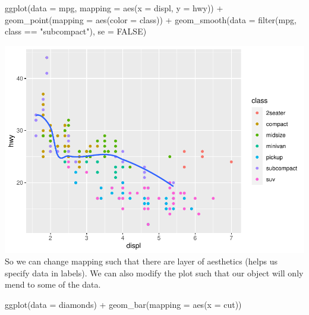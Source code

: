 \documentclass[
]{article}
\newenvironment{Shaded}{\begin{snugshade}}{\end{snugshade}}
\newcommand{\AttributeTok}[1]{\textcolor[rgb]{0.77,0.63,0.00}{#1}}
\newcommand{\ConstantTok}[1]{\textcolor[rgb]{0.00,0.00,0.00}{#1}}
\newcommand{\FunctionTok}[1]{\textcolor[rgb]{0.00,0.00,0.00}{#1}}
\newcommand{\NormalTok}[1]{#1}
\newcommand{\SpecialCharTok}[1]{\textcolor[rgb]{0.00,0.00,0.00}{#1}}
\newcommand{\StringTok}[1]{\textcolor[rgb]{0.31,0.60,0.02}{#1}}
\begin{document}
\begin{Shaded}
\begin{Highlighting}[]
\FunctionTok{ggplot}\NormalTok{(}\AttributeTok{data =}\NormalTok{ mpg, }\AttributeTok{mapping =} \FunctionTok{aes}\NormalTok{(}\AttributeTok{x =}\NormalTok{ displ, }\AttributeTok{y =}\NormalTok{ hwy)) }\SpecialCharTok{+} 
  \FunctionTok{geom\_point}\NormalTok{(}\AttributeTok{mapping =} \FunctionTok{aes}\NormalTok{(}\AttributeTok{color =}\NormalTok{ class)) }\SpecialCharTok{+} 
  \FunctionTok{geom\_smooth}\NormalTok{(}\AttributeTok{data =} \FunctionTok{filter}\NormalTok{(mpg, class }\SpecialCharTok{==} \StringTok{"subcompact"}\NormalTok{), }\AttributeTok{se =} \ConstantTok{FALSE}\NormalTok{)}
\end{Highlighting}
\end{Shaded}

\includegraphics{Journal_files/figure-latex/unnamed-chunk-49-4.pdf} So
we can change mapping such that there are layer of aesthetics (helps us
specify data in labels). We can also modify the plot such that our
object will only mend to some of the data.

\begin{Shaded}
\begin{Highlighting}[]
\FunctionTok{ggplot}\NormalTok{(}\AttributeTok{data =}\NormalTok{ diamonds) }\SpecialCharTok{+} 
  \FunctionTok{geom\_bar}\NormalTok{(}\AttributeTok{mapping =} \FunctionTok{aes}\NormalTok{(}\AttributeTok{x =}\NormalTok{ cut))}
\end{Highlighting}
\end{Shaded}
\end{document}
